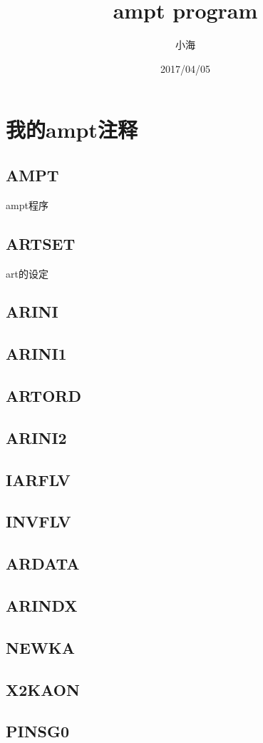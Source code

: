 \documentclass[14pt,UTF8]{ctexbook}
\author{小海}
\date{2017/04/05}
\title{ampt program}
\begin{document}
\maketitle
\tableofcontents

\chapter{我的ampt注释}
\section{AMPT}
ampt程序
\section{ARTSET}
art的设定
\section{ARINI}
\section{ARINI1}
\section{ARTORD}
\section{ARINI2}
\section{IARFLV}
\section{INVFLV}
\section{ARDATA}
\section{ARINDX}
\section{NEWKA}
\section{X2KAON}
\section{PINSG0}
\end{document}

